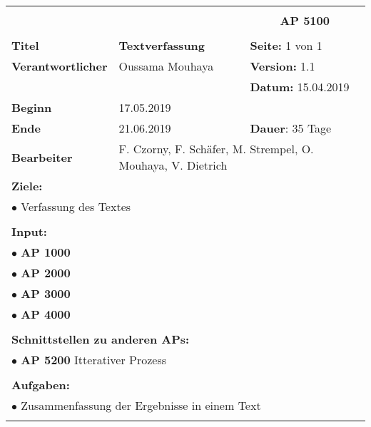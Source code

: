 \clearpage


\begin{table}[!h]
 \begin{center}
  \begin{tabular}{|p{35mm}||p{55mm}|p{50mm}||p{40mm}|}
   \hline
   \multicolumn{3}{|l||}{\textbf{}} & \multicolumn{1}{c|}{}\\
   \multicolumn{3}{|l||}{\textbf{}} & \multicolumn{1}{c|}{\textbf{AP 5100}}\\
   \multicolumn{3}{|l||}{\textbf{}} & \multicolumn{1}{c|}{}\\
   \hline\hline
   \textbf{Titel} & \multicolumn{2}{p{7cm}||}{\textbf{Textverfassung}} & \textbf{Seite:} 1 von 1\\
   \hline
   \textbf{Verantwortlicher} & \multicolumn{2}{l||}{Oussama Mouhaya} & \textbf{Version:} 1.1\\
   \hline
   \multicolumn{3}{|l||}{} & \textbf{Datum:} 15.04.2019\\
   \hline\hline
   \textbf{Beginn} & \multicolumn{2}{l||}{17.05.2019} & \\
   \hline
   \textbf{Ende} & \multicolumn{2}{l||}{21.06.2019} & \textbf{Dauer}: 35 Tage\\
   \hline\hline
   \textbf{Bearbeiter} & \multicolumn{3}{l|}{F. Czorny, F. Schäfer, M. Strempel, O. Mouhaya, V. Dietrich}\\
   \hline\hline
   \multicolumn{4}{|p{150mm}|}{\textbf{Ziele:}}\\
   \multicolumn{4}{|p{150mm}|}{$\bullet$ Verfassung des Textes}\\
   \multicolumn{4}{|p{150mm}|}{}\\
   \multicolumn{4}{|p{150mm}|}{\textbf{Input:}}\\
   \multicolumn{4}{|p{150mm}|}{$\bullet$ \textbf{AP 1000}}\\
   \multicolumn{4}{|p{150mm}|}{$\bullet$ \textbf{AP 2000}}\\
	 \multicolumn{4}{|p{150mm}|}{$\bullet$ \textbf{AP 3000}}\\
	 \multicolumn{4}{|p{150mm}|}{$\bullet$ \textbf{AP 4000}}\\
   \multicolumn{4}{|p{150mm}|}{}\\
   \multicolumn{4}{|p{150mm}|}{\textbf{Schnittstellen zu anderen APs:}}\\
   \multicolumn{4}{|p{150mm}|}{$\bullet$ \textbf{AP 5200} Itterativer Prozess}\\
   \multicolumn{4}{|p{150mm}|}{}\\
   \multicolumn{4}{|p{150mm}|}{\textbf{Aufgaben:}}\\
   \multicolumn{4}{|p{150mm}|}{$\bullet$ Zusammenfassung der Ergebnisse in einem Text}\\
   \multicolumn{4}{|p{150mm}|}{}\\
   \hline
  \end{tabular}
 \end{center}
\end{table}

